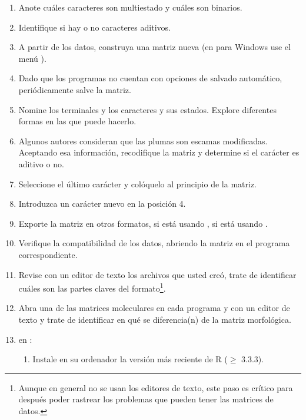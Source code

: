 \begin{enumerate}
	\item Anote cu\'ales caracteres son multiestado y cu\'ales son binarios.

	\item Identifique si hay o no caracteres aditivos.

	\item A partir de los datos, construya una matriz nueva (en  para Windows use el men\'u ). 

	\item Dado que los programas no cuentan con opciones de salvado autom\'atico, peri\'odicamente salve la matriz.

	\item Nomine los terminales y los caracteres y sus estados. Explore diferentes formas en las que puede hacerlo. 

	\item Algunos autores consideran que las plumas son escamas modificadas. Aceptando esa informaci\'on, recodifique la matriz y determine si el car\'acter es aditivo o no.

	\item Seleccione el \'ultimo car\'acter y col\'oquelo al principio de la matriz. 

	\item Introduzca un car\'acter nuevo en la posici\'on 4.

	\item Exporte la matriz en otros formatos,  si est\'a usando ,  si est\'a usando .

	\item Verifique la compatibilidad de los datos, abriendo la matriz en el programa correspondiente.

	\item Revise con un editor de texto los archivos que usted cre\'o, trate de identificar cu\'ales son las partes claves del formato\footnote{Aunque en general no se usan los editores de texto, este paso es cr\'itico para despu\'es poder rastrear los problemas que pueden tener las matrices de datos.}.

	\item Abra una de las matrices moleculares en cada programa y con un editor de texto y trate de identificar en qu\'e se diferencia(n) de la matriz morfol\'ogica.

	\item en :
	\begin{enumerate}
		\item Instale en su ordenador la versi\'on m\'as reciente de R ($\ge$ 3.3.3). 


\end{enumerate}
\end{enumerate}
